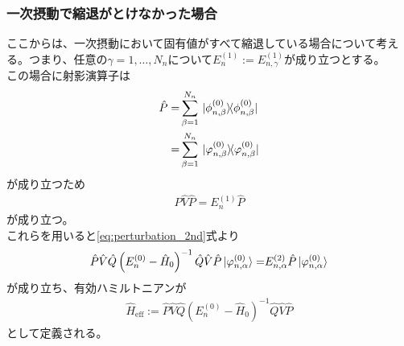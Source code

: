 \documentclass{ltjsarticle}
\begin{document}
\subsubsection{一次摂動で縮退がとけなかった場合}
ここからは、一次摂動において固有値がすべて縮退している場合について考える。つまり、任意の$\gamma=1,\dots,N_n$について$E_n^{(1)}:=E_{n,\gamma}^{(1)}$が成り立つとする。\\
この場合に射影演算子は
\begin{align}
  \hat{P}=&\sum_{\beta=1}^{N_n}\ketbra*{\phi^{(0)}_{n,\beta}}{\phi^{(0)}_{n,\beta}}\\
  =&\sum_{\beta=1}^{N_n}\ketbra*{\varphi^{(0)}_{n,\beta}}{\varphi^{(0)}_{n,\beta}}\\
\end{align}
が成り立つため
\begin{align}
  \hat{P}\hat{V}\hat{P}=E_n^{(1)}\hat{P}
\end{align}
が成り立つ。\\
これらを用いると\eqref{eq:perturbation_2nd}式より
\begin{align}
  \hat{P}\hat{V}\hat{Q}\left( E_n^{(0)}-\hat{H}_0 \right)^{-1}\hat{Q}\hat{V}\hat{P}\ket*{\varphi^{(0)}_{n,\alpha}}=&E^{(2)}_{n,\alpha}\hat{P}\ket*{\varphi^{(0)}_{n,\alpha}}\\
\end{align}
が成り立ち、有効ハミルトニアンが
\begin{align}
  \hat{H}_{\text{eff}}:=\hat{P}\hat{V}\hat{Q}\left( E_n^{(0)}-\hat{H}_0 \right)^{-1}\hat{Q}\hat{V}\hat{P}
\end{align}
として定義される。
\end{document}
